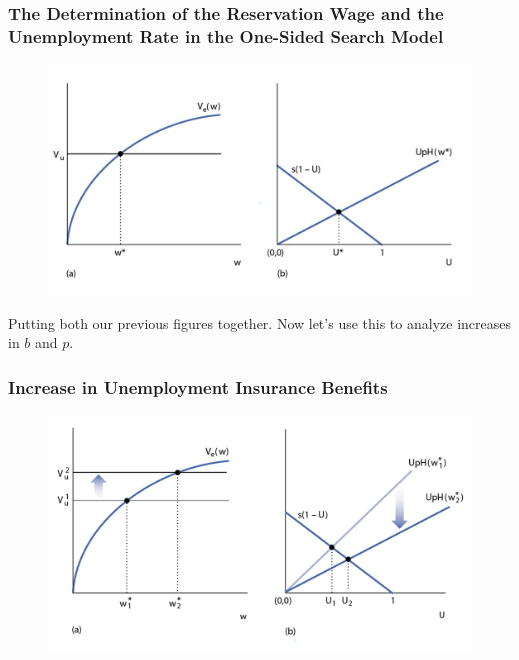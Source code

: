 \documentclass{beamer}
\begin{document}
\begin{frame}
\frametitle[alignment=center]{The Determination of the Reservation Wage and the Unemployment Rate in the One-Sided Search Model}
\begin{figure}
\centering
\includegraphics[scale=0.5]{Figures/W_Fig_6pt14.png}
\end{figure}
Putting both our previous figures together.  Now let's use this to analyze increases in $b$ and $p$.
\end{frame}

\begin{frame}
\frametitle[alignment=center]{Increase in Unemployment Insurance Benefits}
\begin{figure}
\centering
\includegraphics[scale=0.5]{Figures/W_Fig_6pt15.png}
\end{figure}
\end{frame}
\end{document}
